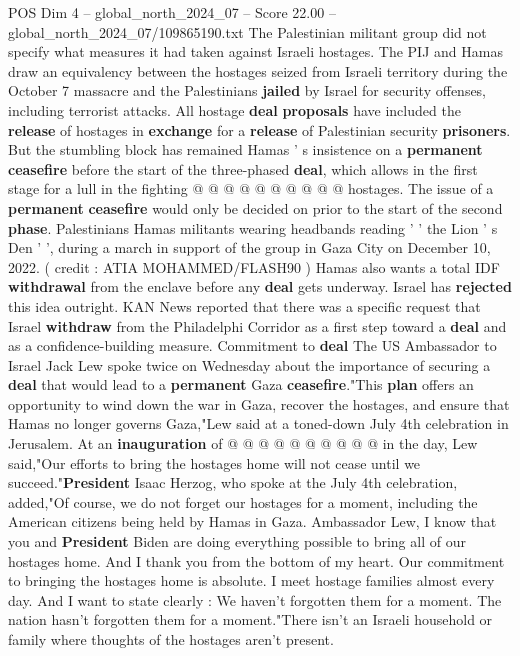 \begin{textsample}{POS Dim 4 – global\_north\_2024\_07 – Score 22.00 – global\_north\_2024\_07/109865190.txt}
The Palestinian militant group did not specify what measures it had taken against Israeli hostages.
The PIJ and Hamas draw an equivalency between the hostages seized from Israeli territory during the October 7 massacre and the Palestinians \textbf{jailed} by Israel for security offenses, including terrorist attacks.
All hostage \textbf{deal} \textbf{proposals} have included the \textbf{release} of hostages in \textbf{exchange} for a \textbf{release} of Palestinian security \textbf{prisoners}.
But the stumbling block has remained Hamas ' s insistence on a \textbf{permanent} \textbf{ceasefire} before the start of the three-phased \textbf{deal}, which allows in the first stage for a lull in the fighting @ @ @ @ @ @ @ @ @ @ hostages.
The issue of a \textbf{permanent} \textbf{ceasefire} would only be decided on prior to the start of the second \textbf{phase}.
Palestinians Hamas militants wearing headbands reading ' ' the Lion ' s Den ' ', during a march in support of the group in Gaza City on December 10, 2022. ( credit : ATIA MOHAMMED/FLASH90 ) Hamas also wants a total IDF \textbf{withdrawal} from the enclave before any \textbf{deal} gets underway.
Israel has \textbf{rejected} this idea outright.
KAN News reported that there was a specific request that Israel \textbf{withdraw} from the Philadelphi Corridor as a first step toward a \textbf{deal} and as a confidence-building measure.
Commitment to \textbf{deal} The US Ambassador to Israel Jack Lew spoke twice on Wednesday about the importance of securing a \textbf{deal} that would lead to a \textbf{permanent} Gaza \textbf{ceasefire}."This \textbf{plan} offers an opportunity to wind down the war in Gaza, recover the hostages, and ensure that Hamas no longer governs Gaza,"Lew said at a toned-down July 4th celebration in Jerusalem.
At an \textbf{inauguration} of @ @ @ @ @ @ @ @ @ @ in the day, Lew said,"Our efforts to bring the hostages home will not cease until we succeed."\textbf{President} Isaac Herzog, who spoke at the July 4th celebration, added,"Of course, we do not forget our hostages for a moment, including the American citizens being held by Hamas in Gaza.
Ambassador Lew, I know that you and \textbf{President} Biden are doing everything possible to bring all of our hostages home.
And I thank you from the bottom of my heart.
Our commitment to bringing the hostages home is absolute.
I meet hostage families almost every day.
And I want to state clearly : We haven't forgotten them for a moment.
The nation hasn't forgotten them for a moment."There isn't an Israeli household or family where thoughts of the hostages aren't present.

\end{textsample}
